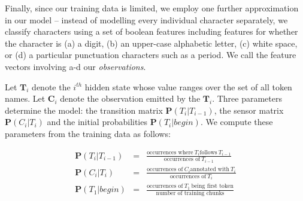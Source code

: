Finally, since our training data is limited, we employ one further
approximation in our model -- instead of modelling every individual
character separately, we classify characters using a set of boolean features
including features for whether the character is (a) a digit, (b) an
upper-case alphabetic letter, (c) white space, or (d) a particular
punctuation characters such as a period.  We call the feature vectors
involving a-d our {\em observations}.

%

Let $\mathbf{T}_i$ denote the $i^{th}$ hidden state whose value ranges over
the set of all token names.
Let $\mathbf{C}_i$ denote the observation emitted by the $\mathbf{T}_i$.
Three parameters determine the model:
the transition matrix $\mathbf{P}(T_i|T_{i-1})$,
the sensor matrix $\mathbf{P}(C_i|T_i)$ and the initial
probabilities $\mathbf{P}(T_i|begin)$. 
We compute these parameters from the training data as follows:

\begin{eqnarray}
\mathbf{P}(T_i|T_{i-1}) & = & \frac{\textrm{occurrences where}~ T_i\textrm{
follows}~ T_{i-1}}{\textrm{occurrences of}~ T_{i-1}} \label{eqn:1}\\
\mathbf{P}(C_i|T_i) & = & \frac{\textrm{occurrences of}~ C_i \textrm{
annotated with}~ T_i}{\textrm{occurrences of}~ T_i} \\
\mathbf{P}(T_1|begin) & = & \frac{\textrm{occurrences of}~ T_1~ \textrm{being first token}}
{\textrm{number of training chunks}} \label{eqn:2}
\end{eqnarray}


